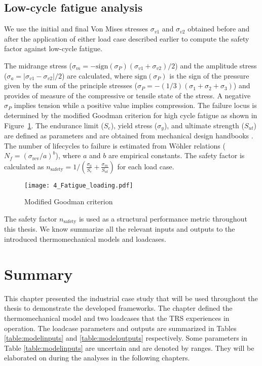\subsection{Low-cycle fatigue analysis} \label{subsec:fatigueanalysis}

We use the initial and final Von Mises stresses $\sigma_{v1}$ and $\sigma_{v2}$ obtained before and after the application of either load case described earlier to compute the safety factor against low-cycle fatigue.

The midrange stress ($\sigma_m = -\textrm{sign}(\sigma_P)\left( \sigma_{v1} + \sigma_{v2}\right) / 2$) and the amplitude stress ($\sigma_a = \left| \sigma_{v1} - \sigma_{v2}\right| / 2$) are calculated, where $\textrm{sign}(\sigma_P)$ is the sign of the pressure given by the sum of the principle stresses ($\sigma_P = -(1/3) (\sigma_1 + \sigma_2 + \sigma_3)$) and provides of measure of the compressive or tensile state of the stress. A negative $\sigma_P$ implies tension while a positive value implies compression. The failure locus is determined by the modified Goodman criterion for high cycle fatigue as shown in Figure~\ref{fig:GMcrit}. The endurance limit ($S_e$), yield stress ($\sigma_y$), and ultimate strength ($S_{ut}$) are defined as parameters and are obtained from mechanical design handbooks \cite{Budynas2015}. The number of lifecycles to failure is estimated from W{\"o}hler relations ($N_f = \left(\sigma_{\textrm{rev}}/a\right)^b$), where $a$ and $b$ are empirical constants. The safety factor is calculated as $n_{\textrm{safety}} = 1/\left({\frac{\sigma_a}{S_e}+\frac{\sigma_m}{S_{ut}}}\right)$ for each load case.

\begin{figure}[h!]
    \centering
    \texttt{[image: 4\_Fatigue\_loading.pdf]}
    \caption{ \label{fig:GMcrit} Modified Goodman criterion }
\end{figure}

The safety factor $n_{\textrm{safety}}$ is used as a structural performance metric throughout this thesis. We know summarize all the relevant inputs and outputs to the introduced thermomechanical models and loadcases.

\section{Summary}
\label{sec:thermosummary}

This chapter presented the industrial case study that will be used throughout the thesis to demonstrate the developed frameworks. The chapter defined the thermomechanical model and two loadcases that the \ac{TRS} experiences in operation. The loadcase parameters and outputs are summarized in Tables \ref{table:modelinputs} and \ref{table:modeloutputs} respectively. Some parameters in Table \ref{table:modelinputs} are uncertain and are denoted by ranges. They will be elaborated on during the analyses in the following chapters.

